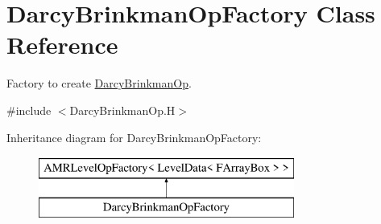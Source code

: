 \hypertarget{class_darcy_brinkman_op_factory}{\section{Darcy\-Brinkman\-Op\-Factory Class Reference}
\label{class_darcy_brinkman_op_factory}
}


Factory to create \hyperlink{class_darcy_brinkman_op}{Darcy\-Brinkman\-Op}.  




{\ttfamily \#include $<$Darcy\-Brinkman\-Op.\-H$>$}

Inheritance diagram for Darcy\-Brinkman\-Op\-Factory\-:\begin{figure}[H]
\begin{center}
\leavevmode
\includegraphics[height=2.000000cm]{class_darcy_brinkman_op_factory}
\end{center}
\end{figure}
